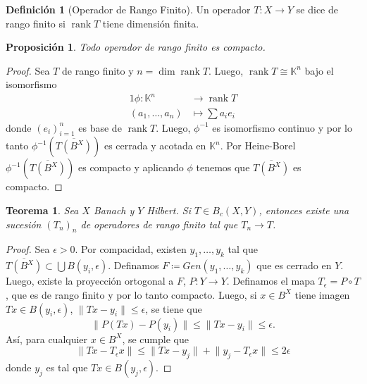 \documentclass{article}
\newtheorem{Teorema}{Teorema}
\newtheorem{Proposicion}{Proposición}
\theoremstyle{plain}
\theoremstyle{definition}
\newtheorem{Definicion}{Definición}
\newcommand{\1}[1]{\mathbbm{1}\left( #1 \right)}
\newcommand{\K}{\mathbb{K}}
\DeclareMathOperator{\rank}{rank}
\newcommand{\norm}[1]{\lVert #1 \rVert}
\begin{document}
\begin{Definicion}[Operador de Rango Finito]
  Un operador \(T\colon X\to Y\) se dice de rango finito si \(\rank T\) tiene dimensión finita.
\end{Definicion}

\begin{Proposicion}
  Todo operador de rango finito es compacto.
\end{Proposicion}
\begin{proof}
  Sea \(T\) de rango finito y \(n = \dim \rank T\). Luego, \(\rank T \cong \K^n\) 
  bajo el isomorfismo
  \begin{alignat*}{1}
    \phi \colon \K^n &\to \rank T\\
    (a_1, \ldots, a_n) &\mapsto \sum a_i e_i
  \end{alignat*}
  donde \((e_i)_{i=1}^n\) es base de \(\rank T\). 
  Luego, \(\phi^{-1}\) es isomorfismo continuo y por lo tanto
  \(\phi^{-1}(\overline{T(B^X)})\) es cerrada y acotada en \(\K^n\). 
  Por Heine-Borel \(\phi^{-1}(\overline{T(B^X)})\) es compacto
  y aplicando \(\phi\) tenemos que \(\overline{T(B^X)}\) es compacto. 
\end{proof}

\begin{Teorema}
  Sea \(X\) Banach y \(Y\) Hilbert. Si \(T\in B_c(X,Y)\), entonces existe una sucesión
  \((T_n)_n\) de operadores de rango finito tal que \(T_n \to T\).  
\end{Teorema}
\begin{proof}
  Sea \(\epsilon>0\). Por compacidad, existen \(y_1, \ldots, y_k\) tal que 
  \(\overline{T(B^X)} \subset \bigcup B(y_i, \epsilon)\). 
  Definamos \(F\coloneqq Gen(y_1, \ldots, y_k)\) que es cerrado en \(Y\). Luego,
  existe la proyección ortogonal a \(F\), \(P\colon Y \to Y\). Definamos
  el mapa \(T_{\epsilon} = P \circ T\), que es de rango finito y por lo tanto
  compacto. Luego, si \(x\in B^{X}\) tiene imagen \(Tx \in B(y_i, \epsilon)\),
  \(\norm{Tx - y_i} \le \epsilon\), se tiene que
  \begin{displaymath}
    \norm{ P(Tx) - P(y_i)} \le \norm{Tx - y_i} \le \epsilon.
  \end{displaymath}
  Así, para cualquier \(x\in B^X\), se cumple que
  \begin{displaymath}
    \norm{Tx - T_{\epsilon}x}
    \le
    \norm{Tx - y_j} + \norm{y_j - T_{\epsilon}x}
    \le
    2 \epsilon
  \end{displaymath}
  donde \(y_j\) es tal que \(Tx \in B(y_j,\epsilon)\).  
\end{proof}
\end{document}
